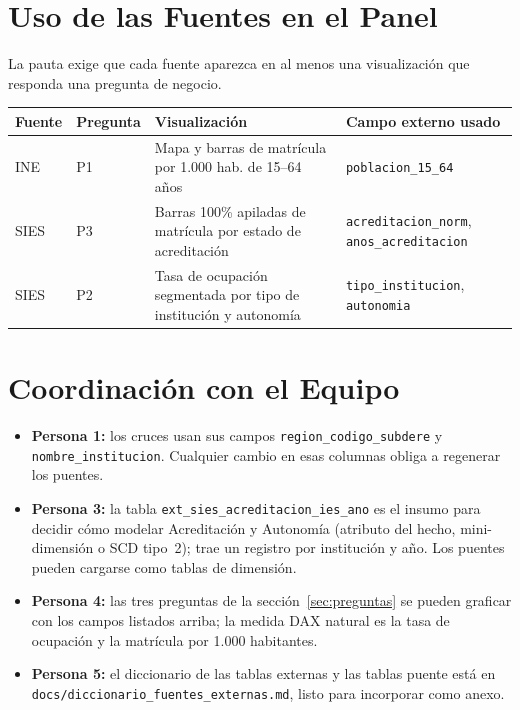 \documentclass[11pt,a4paper]{article}
\begin{document}
\section{Uso de las Fuentes en el Panel}
La pauta exige que cada fuente aparezca en al menos una visualizaci\'on que responda una pregunta de negocio.

\begin{center}
\small
\begin{tabularx}{\textwidth}{@{}llYY@{}}
\toprule
\textbf{Fuente} & \textbf{Pregunta} & \textbf{Visualizaci\'on} & \textbf{Campo externo usado} \\
\midrule
INE & P1 & Mapa y barras de matr\'icula por 1.000 hab. de 15--64 a\~nos & \texttt{poblacion\_15\_64} \\
SIES & P3 & Barras 100\% apiladas de matr\'icula por estado de acreditaci\'on & \texttt{acreditacion\_norm}, \texttt{anos\_acreditacion} \\
SIES & P2 & Tasa de ocupaci\'on segmentada por tipo de instituci\'on y autonom\'ia & \texttt{tipo\_institucion}, \texttt{autonomia} \\
\bottomrule
\end{tabularx}
\end{center}

\section{Coordinaci\'on con el Equipo}
\begin{itemize}
    \item \textbf{Persona 1:} los cruces usan sus campos \texttt{region\_codigo\_subdere} y \texttt{nombre\_institucion}. Cualquier cambio en esas columnas obliga a regenerar los puentes.
    \item \textbf{Persona 3:} la tabla \texttt{ext\_sies\_acreditacion\_ies\_ano} es el insumo para decidir c\'omo modelar Acreditaci\'on y Autonom\'ia (atributo del hecho, mini-dimensi\'on o SCD tipo~2); trae un registro por instituci\'on y a\~no. Los puentes pueden cargarse como tablas de dimensi\'on.
    \item \textbf{Persona 4:} las tres preguntas de la secci\'on~\ref{sec:preguntas} se pueden graficar con los campos listados arriba; la medida DAX natural es la tasa de ocupaci\'on y la matr\'icula por 1.000 habitantes.
    \item \textbf{Persona 5:} el diccionario de las tablas externas y las tablas puente est\'a en \texttt{docs/diccionario\_fuentes\_externas.md}, listo para incorporar como anexo.
\end{itemize}
\end{document}
